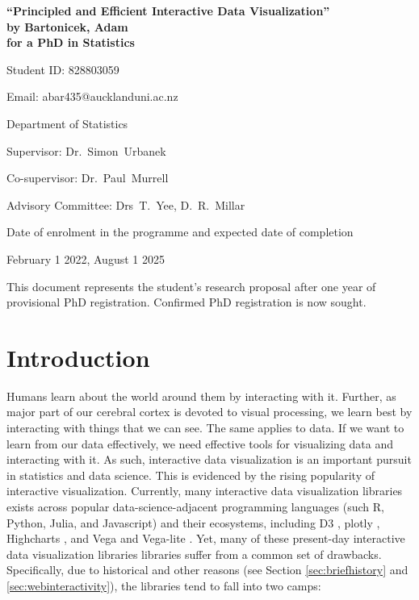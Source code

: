 \documentclass[12pt,a4paper]{article}
\begin{document}
\begin{Large}
\begin{center}
\textbf{``Principled and Efficient Interactive Data Visualization''} \\
\textbf{by Bartonicek, Adam} \\
\textbf{for a PhD in Statistics}
\end{center}
\end{Large}


\hfill{Student ID: 828803059}

\hfill{Email: abar435@aucklanduni.ac.nz}

\hfill{Department of Statistics}

Supervisor: Dr.~Simon~Urbanek

Co-supervisor: Dr.~Paul~Murrell

Advisory Committee: Drs~T.~Yee, D.~R.~Millar


\begin{center}
Date of enrolment in the programme and expected date of completion
\end{center}

\begin{center}
February 1 2022, August 1 2025
\end{center}



This document represents the student's research proposal after
one year of provisional PhD registration.
Confirmed PhD registration is now sought.


\section{Introduction}
\label{sec:intro}



Humans learn about the world around them by interacting with it. Further, as major part of our cerebral cortex is devoted to visual processing, we learn best by interacting with things that we can see. The same applies to data. If we want to learn from our data effectively, we need effective tools for visualizing data and interacting with it. As such, interactive data visualization is an important pursuit in statistics and data science. This is evidenced by the rising popularity of interactive visualization. Currently, many interactive data visualization libraries exists across popular data-science-adjacent programming languages (such R, Python, Julia, and Javascript) and their ecosystems, including D3 \citep{bostock2011}, plotly \citep{plotly2023}, Highcharts \citep{highcharts2023}, and Vega \citep{satyanarayan2015} and Vega-lite \citep{satyanarayan2016}. Yet, many of these present-day interactive data visualization libraries libraries suffer from a common set of drawbacks. Specifically, due to historical and other reasons (see Section \ref{sec:briefhistory} and \ref{sec:webinteractivity}), the libraries tend to fall into two camps: 
\end{document}
